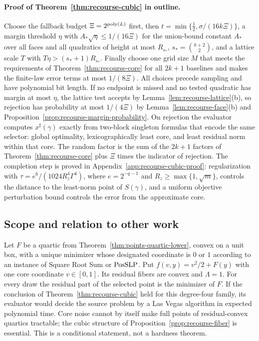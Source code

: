 \paragraph{Proof of Theorem~\ref{thm:recourse-cubic} in outline.}
Choose the fallback budget $\Xi=2^{\operatorname{poly}(L)}$ first, then
$t=\min\{\frac12,\sigma/(16k\Xi)\}$, a margin threshold $\eta$ with
$A_*\sqrt\eta\le1/(16\Xi)$ for the union-bound constant $A_*$ over all
faces and all quadratics of height at most $R_{s_*}$,
$s_*=\binom{k+2}2$, and a lattice scale $T$ with
$T\eta>(s_*+1)R_{s_*}$. Finally choose one grid size $M$ that meets the
requirements of Theorem~\ref{thm:recourse-core} for all $2k+1$
baselines and makes the finite-law error terms at most $1/(8\Xi)$. All
choices precede sampling and have polynomial bit length. If no endpoint
is missed and no tested quadratic has margin at most $\eta$, the lattice
test accepts by Lemma~\ref{lem:recourse-lattice}(b), so rejection has
probability at most $1/(4\Xi)$ by Lemma~\ref{lem:recourse-face}(b) and
Proposition~\ref{prop:recourse-margin-probability}. On rejection the
evaluator computes $x^\sharp(\gamma)$ exactly from two-block singleton
formulas that encode the same selector: global optimality,
lexicographically least core, and least residual norm within that core.
The random factor is the sum of the $2k+1$ factors of
Theorem~\ref{thm:recourse-core} plus $\Xi$ times the indicator of
rejection. The completion step is proved in
Appendix~\ref{app:recourse-cubic-proof}: regularization with
$\tau=e^6/(1024R_z^4\Gamma^4)$, where $e=2^{-q-1}$ and
$R_z\ge\max\{1,\sqrt m\}$, controls the distance to the least-norm point of $S(\gamma)$, and a
uniform objective perturbation bound controls the error from the
approximate core.

\subsection{Scope and relation to other work}
\label{sec:recourse-scope}

\begin{remark}
\label{rem:recourse-quartic}
Let $F$ be a quartic from Theorem~\ref{thm:points-quartic-lower}, convex
on a unit box, with a unique minimizer whose designated coordinate is
$0$ or $1$ according to an instance of Square Root Sum or $\mathrm{PosSLP}$.
Put $f(v,y)=v^2/2+F(y)$ with one core coordinate $v\in[0,1]$. Its
residual fibers are convex and $\Lambda=1$. For every draw the residual
part of the selected point is the minimizer of $F$. If the conclusion
of Theorem~\ref{thm:recourse-cubic} held for this degree-four family,
its evaluator would decide the source problem by a Las Vegas algorithm
in expected polynomial time. Core noise cannot by itself make full points
of residual-convex quartics tractable; the cubic structure of
Proposition~\ref{prop:recourse-fiber} is essential. This is a
conditional statement, not a hardness theorem.
\end{remark}

